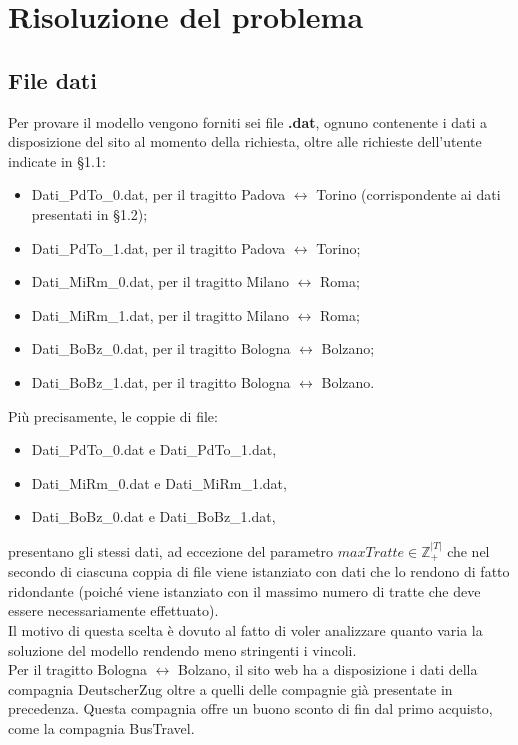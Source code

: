 \documentclass[main.tex]{subfiles}
\begin{document}
\section{Risoluzione del problema}
\subsection{File dati}
Per provare il modello vengono forniti sei file \textbf{.dat}, ognuno contenente i dati a disposizione del sito al momento della richiesta, oltre alle richieste
dell'utente indicate in §1.1:
\begin{itemize}
    \item Dati\_PdTo\_0.dat, per il tragitto Padova $\leftrightarrow$ Torino (corrispondente ai dati presentati in §1.2);
    \item Dati\_PdTo\_1.dat, per il tragitto Padova $\leftrightarrow$ Torino;
    \item Dati\_MiRm\_0.dat, per il tragitto Milano $\leftrightarrow$ Roma;
    \item Dati\_MiRm\_1.dat, per il tragitto Milano $\leftrightarrow$ Roma;
    \item Dati\_BoBz\_0.dat, per il tragitto Bologna $\leftrightarrow$ Bolzano;
    \item Dati\_BoBz\_1.dat, per il tragitto Bologna $\leftrightarrow$ Bolzano.
\end{itemize}
Più precisamente, le coppie di file:
\begin{itemize}
    \item Dati\_PdTo\_0.dat e Dati\_PdTo\_1.dat,
    \item Dati\_MiRm\_0.dat e Dati\_MiRm\_1.dat,
    \item Dati\_BoBz\_0.dat e Dati\_BoBz\_1.dat,
\end{itemize}
presentano gli stessi dati, ad eccezione del parametro $maxTratte \in \mathbb{Z}_+^{|T|}$ che nel secondo di ciascuna coppia di file viene istanziato 
con dati che lo rendono di fatto ridondante (poiché viene istanziato con il massimo numero di tratte che deve essere necessariamente effettuato).\\
Il motivo di questa scelta è dovuto al fatto di voler analizzare quanto varia la soluzione del modello rendendo meno stringenti i vincoli.\\
Per il tragitto Bologna $\leftrightarrow$ Bolzano, il sito web ha a disposizione i dati della compagnia DeutscherZug oltre a quelli delle compagnie già presentate in precedenza. 
Questa compagnia offre un buono sconto di  fin dal primo acquisto, come la compagnia BusTravel.
\end{document}
